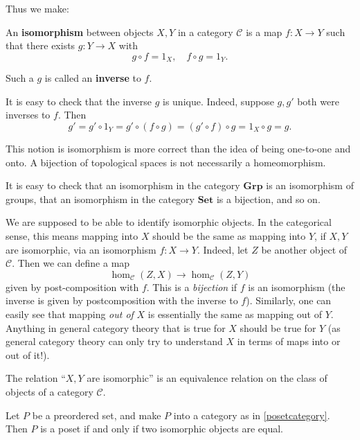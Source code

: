 Thus we make:

\begin{definition}
An \textbf{isomorphism} between objects $X, Y$ in a category $\mathcal{C}$ is a
map $f: X \to Y$ such that there exists $g: Y \to X$ with
\[ g \circ f = 1_X, \quad f \circ g = 1_Y.  \]

Such a $g$ is called an \textbf{inverse} to $f$. \end{definition}

\begin{remark}
It is easy to check that the inverse $g$ is
unique. Indeed, suppose $g, g'$ both were inverses to $f$. Then 
\[ g' = g' \circ 1_Y = g' \circ (f \circ g) = (g' \circ f) \circ g = 1_X
\circ g = g.  \]
\end{remark}

This notion is isomorphism is more correct than the idea of being one-to-one and onto. A bijection of
topological spaces is not necessarily a homeomorphism.


\begin{example} 
It is easy to check that an isomorphism in the category $\mathbf{Grp}$ is an
isomorphism of groups, that an isomorphism in the category $\mathbf{Set}$ is a
bijection, and so on. 
\end{example} 

We are supposed to be able to identify isomorphic objects. In the categorical
sense, this means mapping into $X$ should be the same as mapping into $Y$, if
$X, Y$ are isomorphic, via an isomorphism $f: X \to Y$.
Indeed, let 
$Z$ be another object of $\mathcal{C}$.
Then we can define a map
\[ \hom_{\mathcal{C}}(Z, X) \to \hom_{\mathcal{C}}(Z, Y)  \]
given by post-composition with $f$. This is a \emph{bijection} if $f$ is an
isomorphism (the inverse is given by postcomposition with the inverse to $f$).
Similarly, one can easily see that mapping \emph{out of} $X$ is essentially the
same as mapping out of $Y$. 
Anything in general category theory that is true for $X$ should be true for $Y$
(as general category theory can only try to understand $X$ in terms of maps
into or out of it!). 

\begin{exercise} 
The relation ``$X, Y$ are isomorphic'' is an equivalence relation on the class
of objects of a category $\mathcal{C}$.
\end{exercise} 

\begin{exercise} 
Let $P$ be a preordered set, and make $P$ into a category as in
\cref{posetcategory}. Then $P$ is a poset if and only if two isomorphic objects
are equal.
\end{exercise} 

